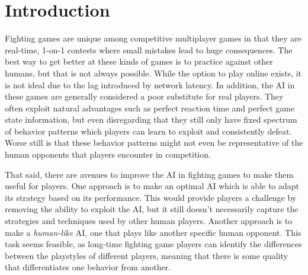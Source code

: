 
\chapter{Introduction} %

\label{Chapter1} %


\newcommand{\keyword}[1]{\textbf{#1}}
\newcommand{\tabhead}[1]{\textbf{#1}}
\newcommand{\code}[1]{\texttt{#1}}
\newcommand{\file}[1]{\texttt{\bfseries#1}}
\newcommand{\option}[1]{\texttt{\itshape#1}}



Fighting games are unique among competitive multiplayer games in that they are real-time, 1-on-1 contests where small mistakes lead to huge consequences. The best way to get better at these kinds of games is to practice against other humans, but that is not always possible. While the option to play online exists, it is not ideal due to the lag introduced by network latency. In addition, the AI in these games are generally considered a poor substitute for real players. They often exploit natural advantages such as perfect reaction time and perfect game state information, but even disregarding that they still only have fixed spectrum of behavior patterns which players can learn to exploit and consistently defeat. Worse still is that these behavior patterns might not even be representative of the human opponents that players encounter in competition.

That said, there are avenues to improve the AI in fighting games to make them useful for players. One approach is to make an optimal AI which is able to adapt its strategy based on its performance. This would provide players a challenge by removing the ability to exploit the AI, but it still doesn't necessarily capture the strategies and techniques used by other human players. Another approach is to make a \textit{human-like} AI, one that plays like another specific human opponent. This task seems feasible, as long-time fighting game players can identify the differences between the playstyles of different players, meaning that there is some quality that differentiates one behavior from another.

